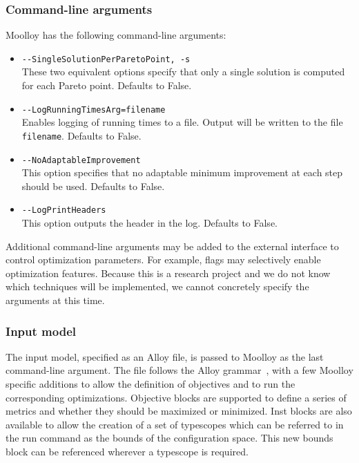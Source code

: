 \documentclass[11pt]{article}
\theoremstyle{definition}
\begin{document}
\subsubsection{Command-line arguments}\label{sec:cl_args}

Moolloy has the following command-line arguments:

\begin{itemize}
  \item \verb|--SingleSolutionPerParetoPoint, -s|\\
  These two equivalent options specify that only a single solution is
  computed for each Pareto point. Defaults to False.


  \item \verb|--LogRunningTimesArg=filename|\\
  Enables logging of running times to a file. Output will be written to the
  file \texttt{filename}. Defaults to False.

  \item \verb|--NoAdaptableImprovement|\\
  This option specifies that no adaptable minimum improvement at each
  step should be used. Defaults to False.

  \item \verb|--LogPrintHeaders|\\
  This option outputs the header in the log. Defaults to False.
\end{itemize}

Additional command-line arguments may be added to the external
interface to control optimization parameters. For example, flags may
selectively enable optimization features. Because this is a research
project and we do not know which techniques will be implemented, we
cannot concretely specify the arguments at this time.

\subsubsection{Input model}\label{sec:in_model}

The input model, specified as an Alloy file, is passed to Moolloy as
the last command-line argument. The file follows the Alloy
grammar~\cite{ref:alloy_grammar}, with a few Moolloy specific additions
to allow the definition of objectives and to run the corresponding
optimizations. Objective blocks are supported to define a series of
metrics and whether they should be maximized or minimized. Inst blocks
are also available to allow the creation of a set of typescopes which
can be referred to in the run command as the bounds of the
configuration space. This new bounds block can be referenced wherever a
typescope is required.
\end{document}
